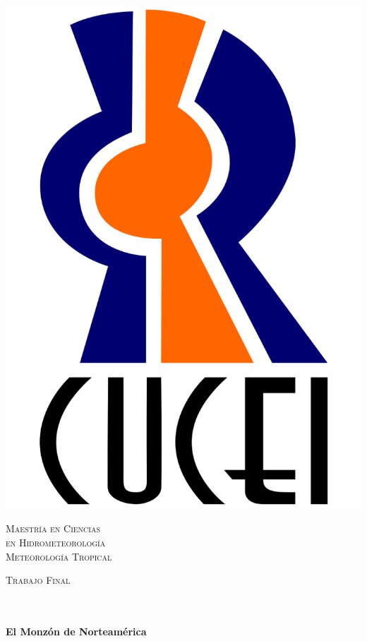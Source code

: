 \documentclass[12pt]{article}
\begin{document}
\begin{center}
\begin{minipage}{0.48\textwidth}
\begin{flushright}
\includegraphics[scale = 0.09]{Imagenes/Escudo_CUCEI.png}
\end{flushright}\end{minipage}

\vspace*{0.7cm}								%
\textsc{\huge Maestría en Ciencias  \\ \vspace{5px} en Hidrometeorología}\\[1.5cm]	

\textsc{\LARGE Meteorología Tropical  }\\[1.5cm]													%

\begin{minipage}{0.9\textwidth} 
\begin{center}																					%
\textsc{\LARGE Trabajo Final }
\end{center}
\end{minipage}\\[0.5cm]
 			\vspace*{1cm}																		%
\HRule \\[0.4cm]																	%
{ \huge \bfseries El Monzón de Norteamérica}\\[0.4cm]	%
\HRule \\[1.5cm]																	%
\begin{center}	\large											%


\end{center}
\end{center}
\end{document}

